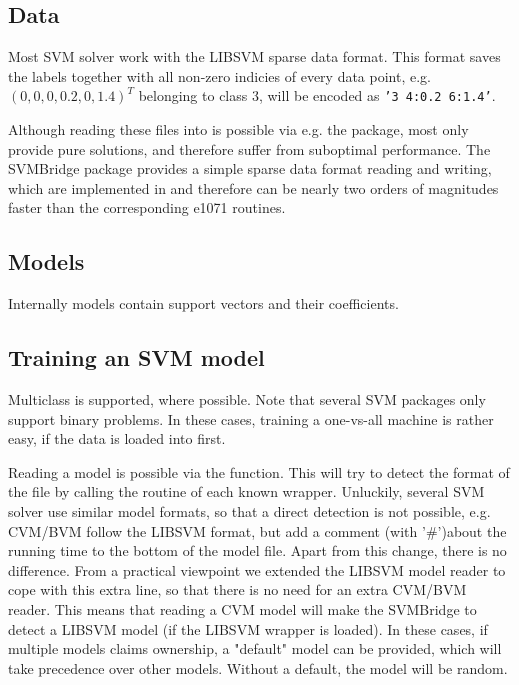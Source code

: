 \documentclass[article, shortnames]{jss}
\begin{document}
\subsection{Data}

Most SVM solver work with the LIBSVM sparse data format.
This format saves the labels together with all non-zero indicies of every data point, e.g.
$(0, 0, 0, 0.2 , 0, 1.4)^T$  belonging to class $3$, will be encoded as \texttt{'3 4:0.2 6:1.4'}.

Although reading these files into  is possible via e.g. the 
 package, most only provide pure  solutions,
and therefore suffer from suboptimal performance.
The SVMBridge package provides a simple sparse data format 
reading and writing, which are implemented in  and
therefore can be nearly two orders of magnitudes faster than
the corresponding e1071 routines.


\subsection{Models}

Internally models contain support vectors and their coefficients.


\subsection{Training an SVM model}

Multiclass is supported, where possible.
Note that several SVM packages only support binary problems.
In these cases, training a one-vs-all machine is rather easy, if the
data is loaded into  first. 


Reading a model is possible via the  function.
This will try to detect the format of the file by calling the 
 routine of each known wrapper.
Unluckily, several SVM solver use similar model formats, so that
a direct detection is not possible, e.g. CVM/BVM follow the LIBSVM
format, but add a comment (with '\#')about the running time to the
bottom of the model file. Apart from this change, there is no difference.
From a practical viewpoint we extended the LIBSVM model reader
to cope with this extra line, so that there is no need for an extra CVM/BVM reader.
This means that reading a CVM model will make the SVMBridge to detect a LIBSVM
model (if the LIBSVM wrapper is loaded).
In these cases, if multiple models claims ownership, a "default" model can be provided,
which will take precedence over other models. Without a default,
the model will be random.
\end{document}
